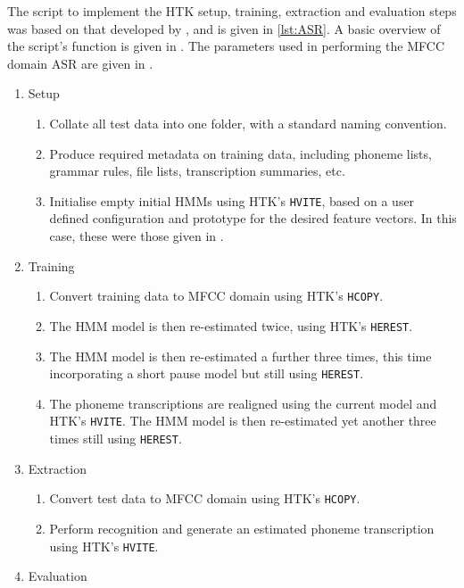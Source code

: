 The script to implement the \ac{HTK} setup, training, extraction
and evaluation steps was based on that developed by \citet{Quill2014},
and is given in \ref{lst:ASR}. A basic overview of the script's function
is given in . The parameters used in performing the \ac{MFCC}
domain \ac{ASR} are given in .

\begin{algorithm}
\begin{enumerate}
\item Setup

\begin{enumerate}
\item Collate all test data into one folder, with a standard naming convention.
\item Produce required metadata on training data, including phoneme lists,
grammar rules, file lists, transcription summaries, etc.
\item Initialise empty initial \acp{HMM} using \ac{HTK}'s \lstinline[language=bash]!HVITE!,
based on a user defined configuration and prototype for the desired
feature vectors. In this case, these were those given in .
\end{enumerate}
\item Training

\begin{enumerate}
\item Convert training data to \ac{MFCC} domain using \ac{HTK}'s \lstinline[language=bash]!HCOPY!.
\item The \ac{HMM} model is then re-estimated twice, using \ac{HTK}'s
\lstinline[language=bash]!HEREST!.
\item The \ac{HMM} model is then re-estimated a further three times, this
time incorporating a short pause model but still using \lstinline[language=bash]!HEREST!.
\item The phoneme transcriptions are realigned using the current model and
\ac{HTK}'s \lstinline[language=bash]!HVITE!. The \ac{HMM} model
is then re-estimated yet another three times still using \lstinline[language=bash]!HEREST!.
\end{enumerate}
\item Extraction

\begin{enumerate}
\item Convert test data to \ac{MFCC} domain using \ac{HTK}'s \lstinline[language=bash]!HCOPY!.
\item Perform recognition and generate an estimated phoneme transcription
using \ac{HTK}'s \lstinline[language=bash]!HVITE!.
\end{enumerate}
\item Evaluation


\end{enumerate}
\end{algorithm}
